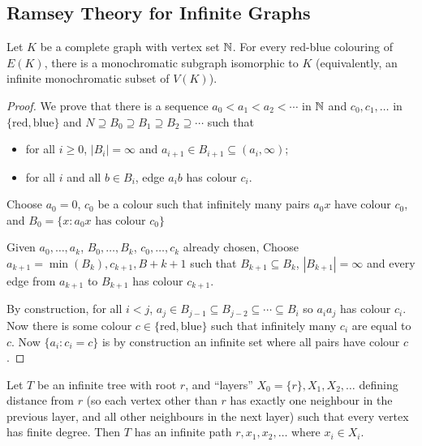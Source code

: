 \documentclass[main.tex]{subfiles}
\begin{document}
\subsection{Ramsey Theory for Infinite Graphs}
\begin{theorem}
  Let $K$ be a complete graph with vertex set $\mathbb N$.
  For every red-blue colouring of $E(K)$, there is a monochromatic subgraph
  isomorphic to $K$ (equivalently, an infinite monochromatic subset of $V(K)$).
\end{theorem}
\begin{proof}%
  We prove that there is a sequence $a_0 < a_1 < a_2 < \cdots$ in $\mathbb N$ and
  $c_0,c_1,\ldots$ in $\{\text{red}, \text{blue}\}$ and
  $N\supseteq B_0\supseteq B_1\supseteq B_2\supseteq\cdots$ such that
  \begin{itemize}
    \item for all $i\geq 0$, $|B_i| = \infty$ and $a_{i+1}\in B_{i+1}\subseteq(a_i,\infty)$;
    \item for all $i$ and all $b\in B_i$, edge $a_ib$ has colour $c_i$.
  \end{itemize}
  Choose $a_0 = 0$, $c_0$ be a colour such that infinitely many pairs $a_0x$
  have colour $c_0$, and $B_0 = \{x : a_0x\text{ has colour }c_0\}$

  Given $a_0,\ldots,a_k$, $B_0,\ldots,B_k$, $c_0,\ldots,c_k$ already chosen,
  Choose $a_{k+1} = \min(B_k), c_{k+1}, B+{k+1}$ such that $B_{k+1}\subseteq B_k$,
  $|B_{k+1}| = \infty$ and every edge from $a_{k+1}$ to $B_{k+1}$ has colour $c_{k+1}$.

  By construction, for all $i < j$,
  $a_j\in B_{j-1}\subseteq B_{j-2}\subseteq\cdots\subseteq B_i$
  so $a_ia_j$ has colour $c_i$.
  Now there is some colour $c\in\{\text{red},\text{blue}\}$ such that infinitely
  many $c_i$ are equal to $c$.
  Now $\{a_i : c_i = c\}$ is by construction an infinite set where all pairs
  have colour $c$.
\end{proof}
\begin{theorem}
  Let $T$ be an infinite tree with root $r$, and ``layers''
  $X_0 = \{r\}, X_1, X_2, \ldots$ defining distance from $r$ (so each vertex
  other than $r$ has exactly one neighbour in the previous layer, and all other
  neighbours in the next layer) such that every vertex has finite degree.
  Then $T$ has an infinite path $r, x_1, x_2,\ldots$ where $x_i\in X_i$.
\end{theorem}
\end{document}
